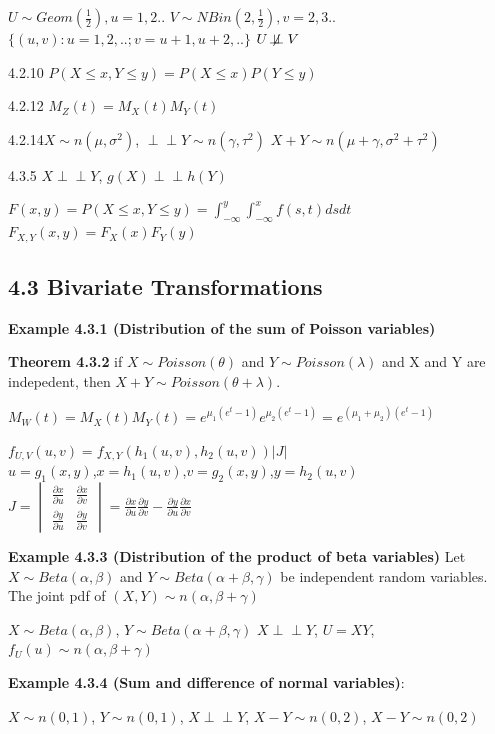 \documentclass[6pt,twocolumn,Portrait]{article}
\begin{document}
\(U\sim Geom(\frac12),u=1,2..\) \(V\sim NBin(2,\frac12),v=2,3..\)
\(\{(u,v):u=1,2,..;v=u+1,u+2,..\}\) \(U\not\!\perp\!\!\!\perp V\)

4.2.10 \(P(X\le x,Y\le y)=P(X\le x)P(Y\le y)\)

4.2.12 \(M_Z(t)=M_X(t)M_Y(t)\)

4.2.14\(X\sim n(\mu,\sigma^2)\),
\(\perp\!\!\!\perp Y\sim n(\gamma,\tau^2)\)
\(X+Y\sim n(\mu+\gamma,\sigma^2+\tau^2)\)

4.3.5 \(X\perp\!\!\!\perp Y\), \(g(X)\perp\!\!\!\perp h(Y)\)

\(F(x,y)=P(X\le x, Y\le y)=\int_{-\infty}^{y}\int_{-\infty}^{x}f(s,t)dsdt\)
\(F_{X,Y}(x,y)=F_X(x)F_Y(y)\)

\hypertarget{trans}{%
\subsection{4.3 Bivariate Transformations}\label{trans}}

\textbf{Example 4.3.1 (Distribution of the sum of Poisson variables)}

\textbf{Theorem 4.3.2} if \(X\sim Poisson(\theta)\) and
\(Y\sim Poisson(\lambda)\) and X and Y are indepedent, then
\(X+Y\sim Poisson(\theta+\lambda)\).

\(M_W(t)=M_X(t)M_Y(t)=e^{\mu_1(e^t-1)}e^{\mu_2(e^t-1)}=e^{(\mu_1+\mu_2)(e^t-1)}\)

\(f_{U,V}(u,v)=f_{X,Y}(h_1(u,v),h_2(u,v))|J|\)\\
\(u=g_1(x,y)\),\(x=h_1(u,v)\),\(v=g_2(x,y)\),\(y=h_2(u,v)\)
\(J=\begin{vmatrix}\frac{\partial x}{\partial u} & \frac{\partial x}{\partial v} \\ \frac{\partial y}{\partial u} & \frac{\partial y}{\partial v} \end{vmatrix}=\frac{\partial x}{\partial u}\frac{\partial y}{\partial v}-\frac{\partial y}{\partial u}\frac{\partial x}{\partial v}\)

\textbf{Example 4.3.3 (Distribution of the product of beta variables)}
Let \(X\sim Beta(\alpha,\beta)\) and \(Y\sim Beta(\alpha+\beta,\gamma)\)
be independent random variables. The joint pdf of
\((X,Y)\sim n(\alpha,\beta+\gamma)\)

\(X\sim Beta(\alpha,\beta)\), \(Y\sim Beta(\alpha+\beta,\gamma)\)
\(X\perp\!\!\!\perp Y\), \(U=XY\), \(f_U(u)\sim n(\alpha,\beta+\gamma)\)

\textbf{Example 4.3.4 (Sum and difference of normal variables)}:

\(X\sim n(0,1)\), \(Y\sim n(0,1)\), \(X\perp\!\!\!\perp Y\),
\(X-Y\sim n(0,2)\), \(X-Y\sim n(0,2)\)
\end{document}
